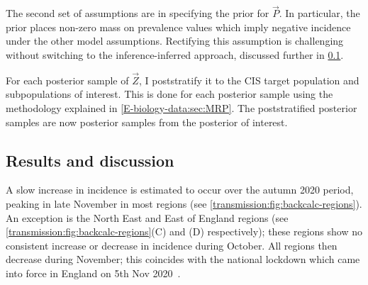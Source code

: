 \documentclass[thesis.tex]{subfiles}
\begin{document}
The second set of assumptions are in specifying the prior for $\vec{P}$.
In particular, the prior places non-zero mass on prevalence values which imply negative incidence under the other model assumptions.
Rectifying this assumption is challenging without switching to the inference-inferred approach, discussed further in \cref{backcalc:sec:results}.

For each posterior sample of $\vec{Z}$, I poststratify it to the CIS target population and subpopulations of interest.
This is done for each posterior sample using the methodology explained in \cref{E-biology-data:sec:MRP}.
The poststratified posterior samples are now posterior samples from the posterior of interest.


\subsection{Results and discussion} \label{backcalc:sec:results}

A slow increase in incidence is estimated to occur over the autumn 2020 period, peaking in late November in most regions (see \cref{transmission:fig:backcalc-regions}).
An exception is the North East and East of England regions (see \cref{transmission:fig:backcalc-regions}(C) and (D) respectively); these regions show no consistent increase or decrease in incidence during October.
All regions then decrease during November; this coincides with the national lockdown which came into force in England on 5th Nov 2020~\autocite{ifgTimeline}.
\end{document}
